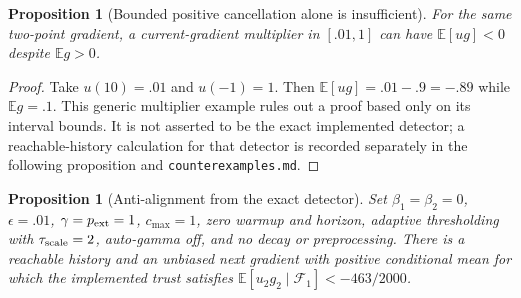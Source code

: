 \documentclass[11pt]{article}
\newtheorem{proposition}[theorem]{Proposition}
\theoremstyle{definition}
\theoremstyle{remark}
\newcommand{\E}{\mathbb E}
\begin{document}
\begin{proposition}[Bounded positive cancellation alone is insufficient]\label{prop:scalarbias}
For the same two-point gradient, a current-gradient multiplier in $[.01,1]$
can have $\E[ug]<0$ despite $\E g>0$.
\end{proposition}
\begin{proof}
Take $u(10)=.01$ and $u(-1)=1$. Then $\E[ug]=.01-.9=-.89$ while
$\E g=.1$. This generic multiplier example rules out a proof based only on
its interval bounds. It is not asserted to be the exact implemented detector;
a reachable-history calculation for that detector is recorded separately in
the following proposition and \texttt{counterexamples.md}.
\end{proof}

\begin{proposition}[Anti-alignment from the exact detector]\label{prop:detectorbias}
Set $\beta_1=\beta_2=0$, $\epsilon=.01$, $\gamma=p_{\rm ext}=1$,
$c_{\max}=1$, zero warmup and horizon, adaptive thresholding with
$\tau_{\rm scale}=2$, auto-gamma off, and no decay or preprocessing.
There is a reachable history and an unbiased next gradient with positive
conditional mean for which the implemented trust satisfies
$\E[u_2g_2\mid\mathcal F_1]<-463/2000$.
\end{proposition}
\end{document}
